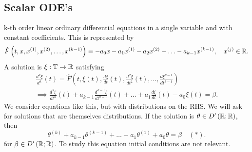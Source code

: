 \subsection{Scalar ODE's}
k-th order linear ordinary differential equations in a single variable and  with constant coefficients. This is represented by  
\[
	\hat{F}\left( t, x ,x^{\left( 1 \right) }, x^{\left( 2 \right) }, \ldots, x^{\left( k - 1 \right) } \right) = -a_0 x - a_1 x^{\left( 1 \right) } - a_2 x^{\left( 2 \right) } - \ldots - a_{k -1} x^{\left( k - 1 \right) } , \quad x^{\left(j \right)} \in  \mathbb{R}
.\] 
A solution is $\xi : \mathbb{T} \to \mathbb{R}$ satisfying 
\begin{align*} %
	\frac{d ^{k} \xi}{d  ^{k}} \left( t  \right) = \hat{F}\left( t, \xi\left( t  \right) , \frac{d \xi}{d t} \left( t \right) , \frac{d ^{2}\xi}{d t ^2} \left( t \right) , \ldots, \frac{d \xi^{k - 1}}{d t ^{k - 1}}  \right)\\
		\implies\frac{d ^{k} \xi}{d t ^{k}} \left( t  \right) + a_{k - 1}\frac{d ^{k - 1}\xi}{d t ^{k -1}}\left( t \right) + \ldots + a_1 \frac{d \xi}{d t} \left( t \right) - a_0 \xi\left( t \right)  = \beta 
.\end{align*}
We consider equations like this, but with distributions on the RHS. We will ask for solutions that are themselves distributions. If the solution is $\theta \in  D ' \left( \mathbb{R}; \mathbb{R} \right) $, then 
\[
	\theta ^{\left( k \right) } + a_{k - 1} \theta ^{\left( k - 1 \right) } + \ldots + a_1 \theta ^{\left( 1 \right) } + a_0 \theta = \beta \quad \left( * \right) 
.\] 
for $\beta \in  D'\left( \mathbb{R}; \mathbb{R} \right) $. To study this equation initial conditions are not relevant. 

